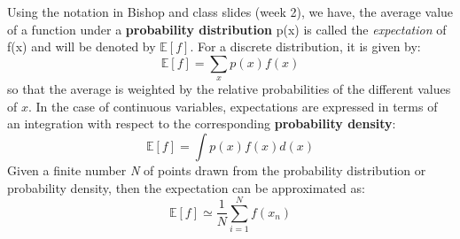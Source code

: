Using the notation in Bishop and class slides (week 2), we have, the average value of a function under a \textbf{probability distribution} p(x) is called the \textit{expectation} of f(x) and will be denoted by $\mathbb{E}[f]$. For a discrete distribution, it is given by:
\begin{equation}
    \mathbb{E}[f] = \sum_xp(x)f(x)
\end{equation}
so that the average is weighted by the relative probabilities of the different values of $x$. In the case of continuous variables, expectations are expressed in terms of an integration with respect to the corresponding \textbf{probability density}:
\begin{equation}
    \mathbb{E}[f] = \int p(x)f(x)d(x)
\end{equation}
Given a finite number \textit{N} of points drawn from the probability distribution or probability density, then the expectation can be approximated as:
\begin{equation}
    \mathbb{E}[f] \simeq \frac{1}{N}\sum_{i=1}^Nf(x_n)
\end{equation}
